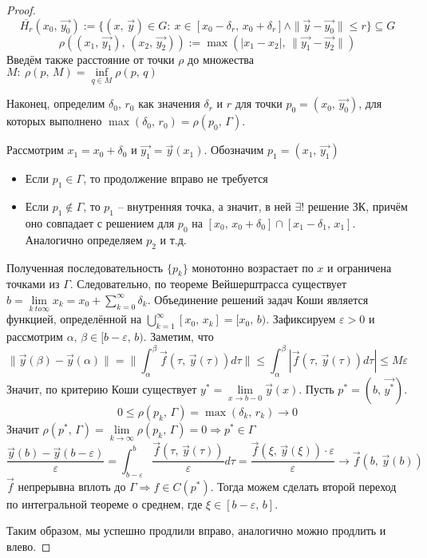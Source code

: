 \documentclass[a4paper,12pt]{article}
\renewcommand{\leq}{\ensuremath{\leqslant}}
\theoremstyle{plain}
\theoremstyle{definition}
\theoremstyle{remark}
\begin{document}
\begin{proof}
	\[\overline{H_r}(x_0,\, \vec{y_0}) := \{(x,\,\vec{y}) \in G:\: x \in [x_0 - \delta_r,\, x_0 + \delta_r] \land \|\vec{y} - \vec{y_0}\| \leq r\} \subseteq G\]
	\[\rho((x_1,\,\vec{y_1}),\, (x_2,\,\vec{y_2})) := \max(|x_1 - x_2|,\, \|\vec{y_1} - \vec{y_2}\|)\]
	Введём также расстояние от точки $\rho$ до множества $M:\: \rho(p,\, M) = \inf\limits_{q \in M} \rho(p,\,q)$

	Наконец, определим $\delta_0,\, r_0$ как значения $\delta_r$ и $r$ для точки $p_0 = (x_0,\,\vec{y_0})$, для которых выполнено $\max(\delta_0,\, r_0) = \rho(p_0,\, \Gamma)$.

	Рассмотрим $x_1 = x_0 + \delta_0$ и $\vec{y_1} = \vec{y}(x_1)$. Обозначим $p_1 = (x_1,\, \vec{y_1})$
	\begin{itemize}
		\item Если $p_1 \in \Gamma$, то продолжение вправо не требуется
		\item Если $p_1 \not\in \Gamma$, то $p_1$ -- внутренняя точка, а значит, в ней $\exists!$ решение ЗК, причём оно совпадает с решением для $p_0$ на $[x_0,\, x_0 + \delta_0] \cap [x_1 - \delta_1,\, x_1]$. Аналогично определяем $p_2$ и т.д.
	\end{itemize}

	Полученная последовательность $\{p_k\}$ монотонно возрастает по $x$ и ограничена точками из $\Gamma$. Следовательно, по теореме Вейшерштрасса существует $b = \lim\limits_{k \ to \infty} x_k = x_0 + \sum\limits_{k = 0}^\infty \delta_k$. Объединение решений задач Коши является функцией, определённой на $\bigcup\limits_{k = 1}^\infty [x_0,\,x_k] = [x_0,\, b)$. Зафиксируем $\varepsilon > 0$ и рассмотрим $\alpha,\, \beta \in [b - \varepsilon,\, b)$. Заметим, что
	\[\|\vec{y}(\beta) - \vec{y}(\alpha)\| = \|\int_\alpha^\beta \vec{f}(\tau,\, \vec{y}(\tau))d\tau\| \leq \int_\alpha^\beta |\vec{f}(\tau,\, \vec{y}(\tau))d\tau| \leq M\varepsilon\]
	Значит, по критерию Коши существует $y^* = \lim\limits_{x \to b - 0} \vec{y}(x)$. Пусть $p^* = (b,\, \vec{y^*})$.
	\[0 \leq \rho(p_k,\, \Gamma) = \max(\delta_k,\, r_k) \to 0\]
	Значит $\rho(p^*,\, \Gamma) = \lim\limits_{k \to \infty}\rho(p_k,\, \Gamma) = 0 \Rightarrow p^* \in \Gamma$
	\[\frac{\vec{y}(b) - \vec{y}(b - \varepsilon)}{\varepsilon} = \int_{b - \varepsilon}^b \frac{\vec{f}(\tau,\, \vec{y}(\tau))}{\varepsilon}d\tau = \frac{\vec{f}(\xi,\, \vec{y}(\xi)) \cdot \varepsilon}{\varepsilon} \to \vec{f}(b,\,\vec{y}(b))\]
	$\vec{f}$ непрерывна вплоть до $\Gamma \Rightarrow f \in C(p^*)$. Тогда можем сделать второй переход по интегральной теореме о среднем, где $\xi \in [b - \varepsilon,\, b]$.

	Таким образом, мы успешно продлили вправо, аналогично можно продлить и влево.
\end{proof}
\end{document}
